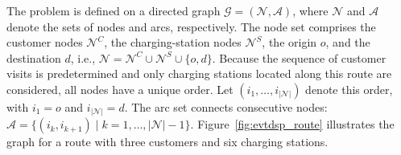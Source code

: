 \documentclass[3p,11pt,authoryear]{elsarticle}  %
\begin{document}
The problem is defined on a directed graph \(\mathcal{G}=(\mathcal{N},\mathcal{A})\), where \(\mathcal{N}\) and \(\mathcal{A}\) denote the sets of nodes and arcs, respectively. The node set comprises the customer nodes \(\mathcal{N}^C\), the charging-station nodes \(\mathcal{N}^S\), the origin \(o\), and the destination \(d\), i.e., $\mathcal{N}=\mathcal{N}^C\cup\mathcal{N}^S\cup\{o,d\}$.
Because the sequence of customer visits is predetermined and only charging stations located along this route are considered, all nodes have a unique order. Let \((i_1,\ldots,i_{|\mathcal{N}|})\) denote this order, with \(i_1=o\) and \(i_{|\mathcal{N}|}=d\). The arc set connects consecutive nodes:
$\mathcal{A}=\{(i_k,i_{k+1})\mid k=1,\ldots,|\mathcal{N}|-1\}$.
Figure~\ref{fig:evtdsp_route} illustrates the graph for a route with three customers and six charging stations.
\end{document}
